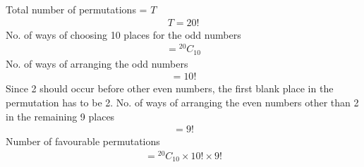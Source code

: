 Total number of permutations = \(T\)
\begin{align}
    T = 20!
\end{align}
No. of ways of choosing 10 places for the odd numbers 
\begin{align}
    = {}^{20}C_{10}
\end{align}
No. of ways of arranging the odd numbers 
\begin{align}
    = 10!
\end{align}
Since 2 should occur before other even numbers, the first blank place in the permutation has to be 2.\newline
No. of ways of arranging the even numbers other than 2 in the remaining 9 places 
\begin{align}
    = 9!
\end{align}
Number of favourable permutations 
\begin{align}
    = {}^{20}C_{10}\times10!\times9!\\\nonumber
\end{align}
